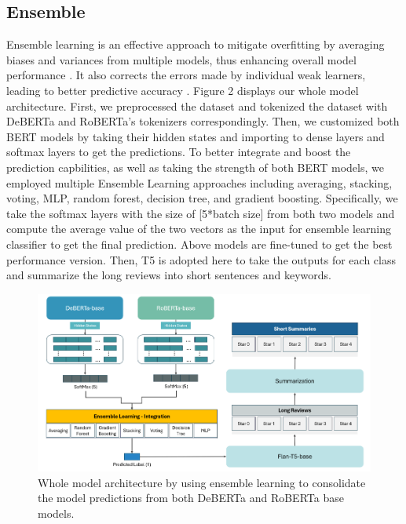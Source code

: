 \documentclass[12pt]{article}
\begin{document}
\subsection{Ensemble}
Ensemble learning is an effective approach to mitigate overfitting by averaging biases and variances from multiple models, thus enhancing overall model performance \citep{opitz1999popular}. It also corrects the errors made by individual weak learners, leading to better predictive accuracy \citep{schapire1990strength}. Figure 2 displays our whole model architecture. First, we preprocessed the dataset and tokenized the dataset with DeBERTa and RoBERTa’s tokenizers correspondingly. Then, we customized both BERT models by taking their hidden states and importing to dense layers and softmax layers to get the predictions. To better integrate and boost the prediction capbilities, as well as taking the strength of both BERT models, we employed multiple Ensemble Learning approaches including averaging, stacking, voting, MLP, random forest, decision tree, and gradient boosting. Specifically, we take the softmax layers with the size of [5*batch size] from both two models and compute the average value of the two vectors as the input for ensemble learning classifier to get the final prediction. Above models are fine-tuned to get the best performance version. Then, T5 is adopted here to take the outputs for each class and summarize the long reviews into short sentences and keywords.

\begin{figure}[h!]
  \centering
  \includegraphics[width=1.0\textwidth, height=0.3\textheight]{./model_architecture.png}
  \caption{Whole model architecture by using ensemble learning to consolidate the model predictions from both DeBERTa and RoBERTa base models.}
  \label{fig:model_architecture}
\end{figure}
\end{document}
